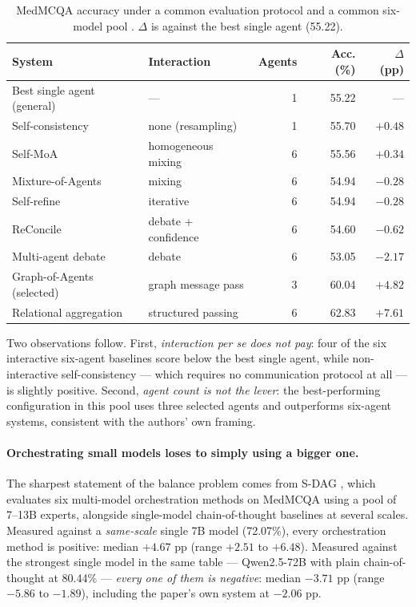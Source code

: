 \documentclass[11pt,a4paper]{article}
\begin{document}
\begin{table}[ht]\centering\small
\caption{MedMCQA accuracy under a common evaluation protocol and a common six-model pool
\citep{yun2604,mehrabi2606}. $\Delta$ is against the best single agent (55.22).}
\label{tab:goa}
\begin{tabular}{llrrr}
\toprule
System & Interaction & Agents & Acc. (\%) & $\Delta$ (pp) \\
\midrule
Best single agent (general)      & ---                & 1 & 55.22 & --- \\
Self-consistency                 & none (resampling)  & 1 & 55.70 & $+0.48$ \\
Self-MoA                         & homogeneous mixing & 6 & 55.56 & $+0.34$ \\
Mixture-of-Agents                & mixing             & 6 & 54.94 & $-0.28$ \\
Self-refine                      & iterative          & 6 & 54.94 & $-0.28$ \\
ReConcile                        & debate + confidence& 6 & 54.60 & $-0.62$ \\
Multi-agent debate               & debate             & 6 & 53.05 & $-2.17$ \\
Graph-of-Agents (selected)       & graph message pass & 3 & 60.04 & $+4.82$ \\
Relational aggregation           & structured passing & 6 & 62.83 & $+7.61$ \\
\bottomrule
\end{tabular}
\end{table}

Two observations follow. First, \emph{interaction per se does not pay}: four of the six
interactive six-agent baselines score below the best single agent, while non-interactive
self-consistency --- which requires no communication protocol at all --- is slightly
positive. Second, \emph{agent count is not the lever}: the best-performing configuration in
this pool uses three selected agents and outperforms six-agent systems, consistent with the
authors' own framing.

\paragraph{Orchestrating small models loses to simply using a bigger one.}
The sharpest statement of the balance problem comes from S-DAG \citep{wang2511}, which
evaluates six multi-model orchestration methods on MedMCQA using a pool of 7--13B experts,
alongside single-model chain-of-thought baselines at several scales. Measured against a
\emph{same-scale} single 7B model (72.07\%), every orchestration method is positive:
median $+4.67$ pp (range $+2.51$ to $+6.48$). Measured against the strongest single model
in the same table --- Qwen2.5-72B with plain chain-of-thought at 80.44\% --- \emph{every
one of them is negative}: median $-3.71$ pp (range $-5.86$ to $-1.89$), including the
paper's own system at $-2.06$ pp.
\end{document}
